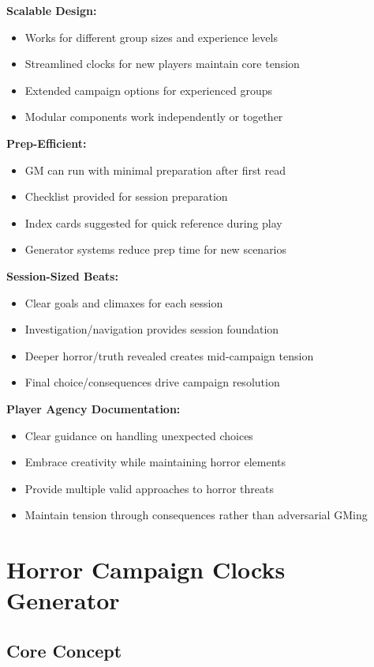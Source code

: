 \documentclass[11pt]{article}
\begin{document}
\textbf{Scalable Design:}
\begin{itemize}
\item Works for different group sizes and experience levels
\item Streamlined clocks for new players maintain core tension
\item Extended campaign options for experienced groups
\item Modular components work independently or together
\end{itemize}

\textbf{Prep-Efficient:}
\begin{itemize}
\item GM can run with minimal preparation after first read
\item Checklist provided for session preparation
\item Index cards suggested for quick reference during play
\item Generator systems reduce prep time for new scenarios
\end{itemize}

\textbf{Session-Sized Beats:}
\begin{itemize}
\item Clear goals and climaxes for each session
\item Investigation/navigation provides session foundation
\item Deeper horror/truth revealed creates mid-campaign tension
\item Final choice/consequences drive campaign resolution
\end{itemize}

\textbf{Player Agency Documentation:}
\begin{itemize}
\item Clear guidance on handling unexpected choices
\item Embrace creativity while maintaining horror elements
\item Provide multiple valid approaches to horror threats
\item Maintain tension through consequences rather than adversarial GMing
\end{itemize}

\section{Horror Campaign Clocks Generator}

\subsection{Core Concept}
\end{document}
